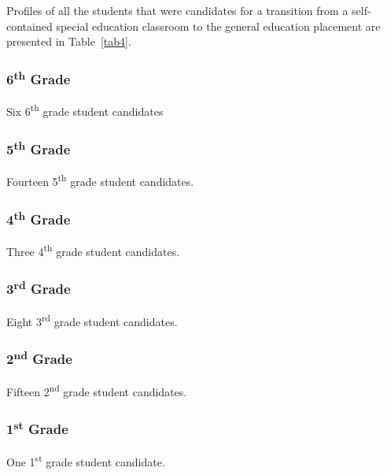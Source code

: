 \documentclass[twoside]{article}
\begin{document}
Profiles of all the students that were candidates for a transition from a self-contained special education classroom to the general education placement are presented in Table~\ref{tab4}.

\subsubsection{6\textsuperscript{th} Grade}
Six 6\textsuperscript{th} grade student candidates

\subsubsection{5\textsuperscript{th} Grade}
Fourteen 5\textsuperscript{th} grade student candidates.

\subsubsection{4\textsuperscript{th} Grade}
Three 4\textsuperscript{th} grade student candidates.

\subsubsection{3\textsuperscript{rd} Grade}
Eight 3\textsuperscript{rd} grade student candidates.

\subsubsection{2\textsuperscript{nd} Grade}
Fifteen 2\textsuperscript{nd} grade student candidates.

\subsubsection{1\textsuperscript{st} Grade}
One 1\textsuperscript{st} grade student candidate.
\end{document}

